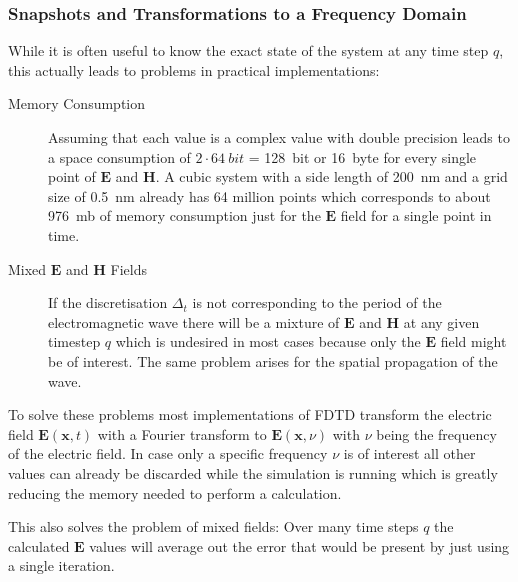 \subsubsection{Snapshots and Transformations to a Frequency Domain}

While it is often useful to know the exact state of the system at any time step $q$, this actually leads to problems in practical implementations:

\begin{description}
  \item[Memory Consumption] Assuming that each value is a complex value with double precision leads to a space consumption of $2\cdot\SI{64}{bit}$ = \SI{128}{bit} or \SI{16}{byte} for every single point of $\mathbf{E}$ and $\mathbf{H}$. A cubic system with a side length of \SI{200}{nm} and a grid size of \SI{0.5}{nm} already has 64 million points which corresponds to about \SI{976}{mb} of memory consumption just for the $\mathbf{E}$ field for a single point in time.
  \item[Mixed $\mathbf{E}$ and $\mathbf{H}$ Fields] If the discretisation $\Delta_t$ is not corresponding to the period of the electromagnetic wave there will be a mixture of $\mathbf{E}$ and $\mathbf{H}$ at any given timestep $q$ which is undesired in most cases because only the $\mathbf{E}$ field might be of interest. The same problem arises for the spatial propagation of the wave.
\end{description}

To solve these problems most implementations of FDTD transform the electric field $\mathbf{E}(\mathbf{x},t)$ with a Fourier transform to $\mathbf{E}(\mathbf{x}, \nu)$ with $\nu$ being the frequency of the electric field. In case only a specific frequency $\nu$ is of interest all other values can already be discarded while the simulation is running which is greatly reducing the memory needed to perform a calculation.

This also solves the problem of mixed fields: Over many time steps $q$ the calculated $\mathbf{E}$ values will average out the error that would be present by just using a single iteration.

